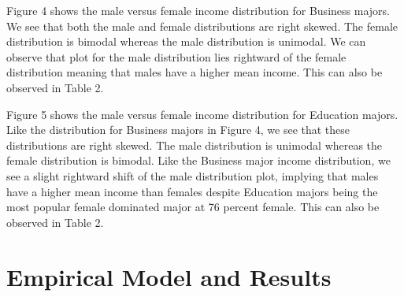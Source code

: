 \documentclass[12pt]{article}
\begin{document}
\par Figure 4 shows the male versus female income distribution for Business majors. We see that both the male and female distributions are right skewed. The female distribution is bimodal whereas the male distribution is unimodal. We can observe that plot for the male distribution lies rightward of the female distribution meaning that males have a higher mean income. This can also be observed in Table 2.

\par Figure 5 shows the male versus female income distribution for Education majors. Like the distribution for Business majors in Figure 4, we see that these distributions are right skewed. The male distribution is unimodal whereas the female distribution is bimodal. Like the Business major income distribution, we see a slight rightward shift of the male distribution plot, implying that males have a higher mean income than females despite Education majors being the most popular female dominated major at 76 percent female. This can also be observed in Table 2.     

\section{Empirical Model and Results}
\end{document}
